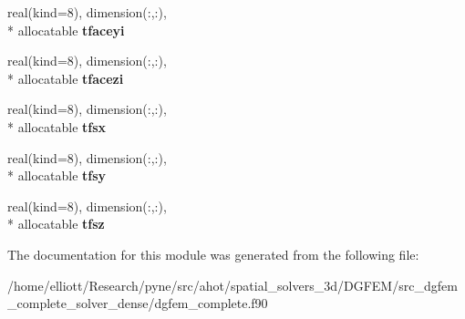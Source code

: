 \begin{DoxyCompactItemize}
\item 
\hypertarget{classdgfem__complete_af85bf1e05f71c76d98d526af5136dee1}{real(kind=8), dimension(\-:,\-:), \\*
allocatable {\bfseries tfaceyi}}\label{classdgfem__complete_af85bf1e05f71c76d98d526af5136dee1}

\item 
\hypertarget{classdgfem__complete_a0285def64a53bc7571d814fc42c792fa}{real(kind=8), dimension(\-:,\-:), \\*
allocatable {\bfseries tfacezi}}\label{classdgfem__complete_a0285def64a53bc7571d814fc42c792fa}

\item 
\hypertarget{classdgfem__complete_a55847a58d7ae96c99ccf66d1011e6e81}{real(kind=8), dimension(\-:,\-:), \\*
allocatable {\bfseries tfsx}}\label{classdgfem__complete_a55847a58d7ae96c99ccf66d1011e6e81}

\item 
\hypertarget{classdgfem__complete_aac557b89d76ddb045babcaad8fa46e3f}{real(kind=8), dimension(\-:,\-:), \\*
allocatable {\bfseries tfsy}}\label{classdgfem__complete_aac557b89d76ddb045babcaad8fa46e3f}

\item 
\hypertarget{classdgfem__complete_a49f986fbeac48027410bd2e2a2736057}{real(kind=8), dimension(\-:,\-:), \\*
allocatable {\bfseries tfsz}}\label{classdgfem__complete_a49f986fbeac48027410bd2e2a2736057}

\end{DoxyCompactItemize}


The documentation for this module was generated from the following file\-:\begin{DoxyCompactItemize}
\item 
/home/elliott/\-Research/pyne/src/ahot/spatial\-\_\-solvers\-\_\-3d/\-D\-G\-F\-E\-M/src\-\_\-dgfem\-\_\-complete\-\_\-solver\-\_\-dense/dgfem\-\_\-complete.\-f90\end{DoxyCompactItemize}
